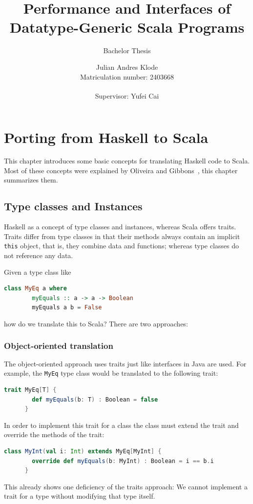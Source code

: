 \documentclass[abstracton,parskip=half]{scrreprt}
\author{Julian Andres Klode\\Matriculation number: 2403668\\\\Supervisor: Yufei Cai}
\title{Performance and Interfaces of Datatype-Generic Scala Programs}
\subtitle{Bachelor Thesis}
\date{}
\newcommand{\cd}{\texttt}
\begin{document}
    \maketitle{}
    

    \tableofcontents{}
    \clearpage
    \setcounter{page}{1}

    


    \chapter{Porting from Haskell to Scala}

    This chapter introduces some basic concepts for translating Haskell code
    to Scala. Most of these concepts were explained by Oliveira and Gibbons~\cite{scalagp}, this
    chapter summarizes them.

    \section{Type classes and Instances}

    Haskell as a concept of type classes and instances, whereas Scala offers
    traits. Traits differ from type classes in that their methods always contain
    an implicit \cd{this} object, that is, they combine data and functions;
    whereas type classes do not reference any data.

    Given a type class like
    \begin{lstlisting}[language=Haskell,gobble=6]
      class MyEq a where
        myEquals :: a -> a -> Boolean
        myEquals a b = False
    \end{lstlisting}
    how do we translate this to Scala? There are two approaches:

    \subsection{Object-oriented translation}
    The object-oriented approach uses traits just like interfaces in
    Java are used. For example, the \cd{MyEq} type class would be translated
    to the following trait:
    \begin{lstlisting}[language=Scala,gobble=6]
      trait MyEq[T] {
        def myEquals(b: T) : Boolean = false
      }
    \end{lstlisting}
    In order to implement this trait for a class the class must extend the
    trait and override the methods of the trait:
    \begin{lstlisting}[language=Scala,gobble=6]
      class MyInt(val i: Int) extends MyEq[MyInt] {
        override def myEquals(b: MyInt) : Boolean = i == b.i
      }
    \end{lstlisting}
    This already shows one deficiency of the traits approach: We cannot
    implement a trait for a type without modifying that type itself.
\end{document}
